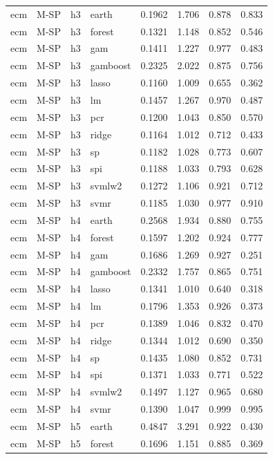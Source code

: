 \begin{ThreePartTable}
\begin{longtable}[t]{llclcccc}
\addlinespace
ecm & M-SP & h3 & earth & 0.1962 & 1.706 & 0.878 & 0.833\\
ecm & M-SP & h3 & forest & 0.1321 & 1.148 & 0.852 & 0.546\\
ecm & M-SP & h3 & gam & 0.1411 & 1.227 & 0.977 & 0.483\\
ecm & M-SP & h3 & gamboost & 0.2325 & 2.022 & 0.875 & 0.756\\
ecm & M-SP & h3 & lasso & 0.1160 & 1.009 & 0.655 & 0.362\\
ecm & M-SP & h3 & lm & 0.1457 & 1.267 & 0.970 & 0.487\\
ecm & M-SP & h3 & pcr & 0.1200 & 1.043 & 0.850 & 0.570\\
ecm & M-SP & h3 & ridge & 0.1164 & 1.012 & 0.712 & 0.433\\
ecm & M-SP & h3 & sp & 0.1182 & 1.028 & 0.773 & 0.607\\
ecm & M-SP & h3 & spi & 0.1188 & 1.033 & 0.793 & 0.628\\
ecm & M-SP & h3 & svmlw2 & 0.1272 & 1.106 & 0.921 & 0.712\\
ecm & M-SP & h3 & svmr & 0.1185 & 1.030 & 0.977 & 0.910\\
\addlinespace
ecm & M-SP & h4 & earth & 0.2568 & 1.934 & 0.880 & 0.755\\
ecm & M-SP & h4 & forest & 0.1597 & 1.202 & 0.924 & 0.777\\
ecm & M-SP & h4 & gam & 0.1686 & 1.269 & 0.927 & 0.251\\
ecm & M-SP & h4 & gamboost & 0.2332 & 1.757 & 0.865 & 0.751\\
ecm & M-SP & h4 & lasso & 0.1341 & 1.010 & 0.640 & 0.318\\
ecm & M-SP & h4 & lm & 0.1796 & 1.353 & 0.926 & 0.373\\
ecm & M-SP & h4 & pcr & 0.1389 & 1.046 & 0.832 & 0.470\\
ecm & M-SP & h4 & ridge & 0.1344 & 1.012 & 0.690 & 0.350\\
ecm & M-SP & h4 & sp & 0.1435 & 1.080 & 0.852 & 0.731\\
ecm & M-SP & h4 & spi & 0.1371 & 1.033 & 0.771 & 0.522\\
ecm & M-SP & h4 & svmlw2 & 0.1497 & 1.127 & 0.965 & 0.680\\
ecm & M-SP & h4 & svmr & 0.1390 & 1.047 & 0.999 & 0.995\\
\addlinespace
ecm & M-SP & h5 & earth & 0.4847 & 3.291 & 0.922 & 0.430\\
ecm & M-SP & h5 & forest & 0.1696 & 1.151 & 0.885 & 0.369\\

\end{longtable}
\end{ThreePartTable}
